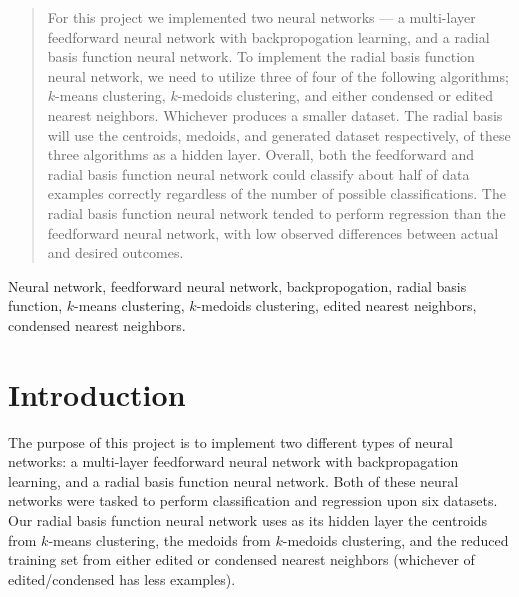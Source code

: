 \documentclass[twoside,11pt]{article}
\begin{document}
\begin{abstract}%
For this project we implemented two neural networks --- a multi-layer feedforward neural network with backpropogation learning, and a radial basis function neural network. To implement the radial basis function neural network, we need to utilize three of four of the following algorithms; $k$-means clustering, $k$-medoids clustering, and either condensed or edited nearest neighbors. Whichever produces a smaller dataset. The radial basis will use the centroids, medoids, and generated dataset respectively, of these three algorithms as a hidden layer. Overall, both the feedforward and radial basis function neural network could classify about half of data examples correctly regardless of the number of possible classifications. The radial basis function neural network tended to perform regression than the feedforward neural network, with low observed differences between actual and desired outcomes.



\end{abstract}


\begin{keywords}
    Neural network, feedforward neural network, backpropogation, radial basis function, $k$-means clustering, $k$-medoids clustering, edited nearest neighbors, condensed nearest neighbors.
\end{keywords}

\section{Introduction}
The purpose of this project is to implement two different types of neural networks: a multi-layer feedforward neural network with backpropagation learning, and a radial basis function neural network. Both of these neural networks were tasked to perform classification and regression upon six datasets. Our radial basis function neural network uses as its hidden layer the centroids from $k$-means clustering, the medoids from $k$-medoids clustering, and the reduced training set from either edited or condensed nearest neighbors (whichever of edited/condensed has less examples).
\end{document}

